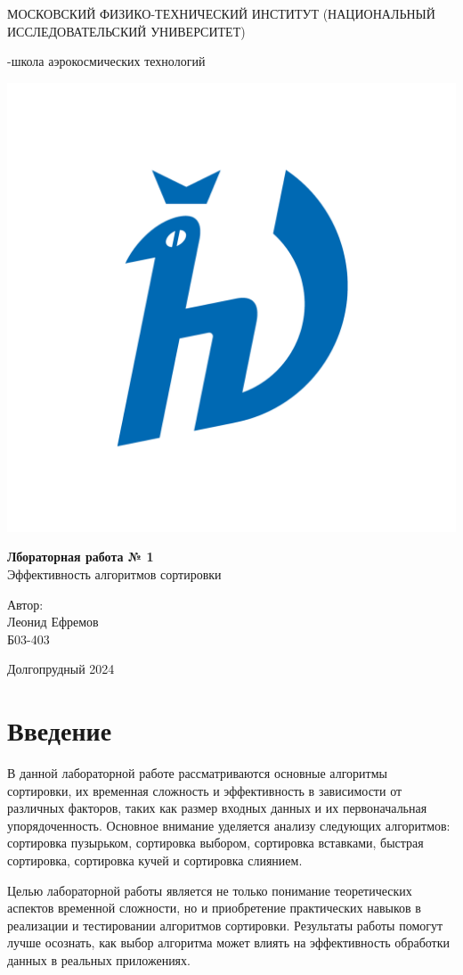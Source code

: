 \documentclass[a4paper,12pt]{article} %
\begin{document}
\begin{titlepage}
\begin{center}
    {\large МОСКОВСКИЙ ФИЗИКО-ТЕХНИЧЕСКИЙ ИНСТИТУТ (НАЦИОНАЛЬНЫЙ ИССЛЕДОВАТЕЛЬСКИЙ УНИВЕРСИТЕТ)}
\end{center}
\begin{center}
    {-школа аэрокосмических технологий}
\end{center}

\vspace{3.5cm}

\begin{center}
    \includegraphics[width=0.4\linewidth]{hv_full.png}
\end{center}
\vspace{0.1cm}
{\huge
\begin{center}
    {\bf Лбораторная работа № 1}\\
    Эффективность алгоритмов сортировки    
\end{center}
}
\vspace{0.5cm}
\begin{flushright}
{\LARGE Автор:\\ 
Леонид Ефремов \\ 
\vspace{0.2cm}
Б03-403}
\end{flushright}
\vspace{3.5cm}
\begin{center}
    Долгопрудный 2024
\end{center}
\end{titlepage}

\tableofcontents
\section{Введение}

В данной лабораторной работе рассматриваются основные алгоритмы сортировки, их временная сложность и эффективность в зависимости от различных факторов, таких как размер входных данных и их первоначальная упорядоченность. Основное внимание уделяется анализу следующих алгоритмов: сортировка пузырьком, сортировка выбором, сортировка вставками, быстрая сортировка, сортировка кучей и сортировка слиянием.\par
Целью лабораторной работы является не только понимание теоретических аспектов временной сложности, но и приобретение практических навыков в реализации и тестировании алгоритмов сортировки. Результаты работы помогут лучше осознать, как выбор алгоритма может влиять на эффективность обработки данных в реальных приложениях.
\end{document}
